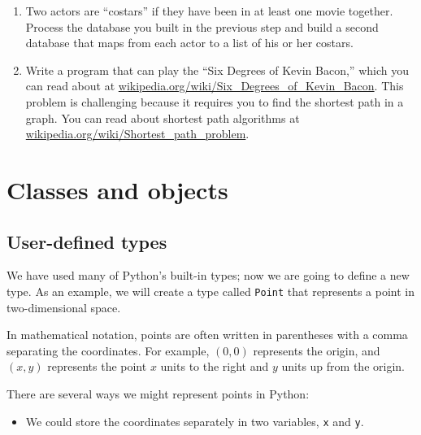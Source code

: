 \documentclass[10pt]{book}
\begin{document}
{\begin{ex}
\begin{enumerate}

\item Two actors are ``costars'' if they have been in at least one
  movie together.  Process the database you built in the previous step
  and build a second database that maps from each actor to a list of
  his or her costars.


\item Write a program that can play the ``Six Degrees of Kevin
  Bacon,'' which you can read about at
  \url{wikipedia.org/wiki/Six_Degrees_of_Kevin_Bacon}.  This
problem is challenging because it requires you to find the shortest
path in a graph.  You can read about shortest path algorithms
at \url{wikipedia.org/wiki/Shortest_path_problem}.

\end{enumerate}

\end{ex}


\chapter{Classes and objects}


\section{User-defined types}
\label{point}


We have used many of Python's built-in types; now we are going
to define a new type.  As an example, we will create a type
called {\tt Point} that represents a point in two-dimensional
space.


In mathematical notation, points are often written in
parentheses with a comma separating the coordinates. For example,
$(0, 0)$ represents the origin, and $(x, y)$ represents the
point $x$ units to the right and $y$ units up from the origin.

There are several ways we might represent points in Python:

\begin{itemize}

\item We could store the coordinates separately in two
variables, {\tt x} and {\tt y}.


\end{itemize}}
\end{document}
